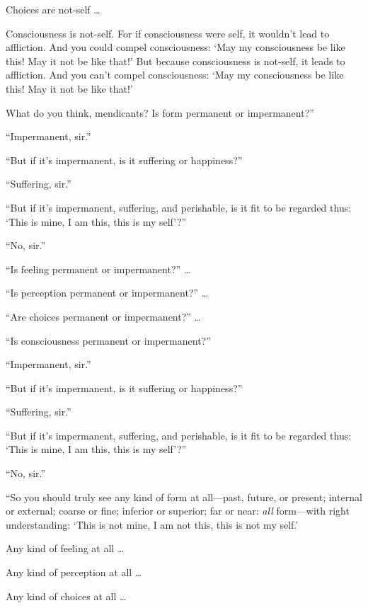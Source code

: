 \documentclass[12pt,openany]{book}%
\begin{document}
Choices are not-self … 

Consciousness is not-self. For if consciousness were self, it wouldn’t lead to affliction. And you could compel consciousness: ‘May my consciousness be like this! May it not be like that!’ But because consciousness is not-self, it leads to affliction. And you can’t compel consciousness: ‘May my consciousness be like this! May it not be like that!’ 

What do you think, mendicants? Is form permanent or impermanent?” 

“Impermanent, sir.” 

“But if it’s impermanent, is it suffering or happiness?” 

“Suffering, sir.” 

“But if it’s impermanent, suffering, and perishable, is it fit to be regarded thus: ‘This is mine, I am this, this is my self’?” 

“No, sir.” 

“Is feeling permanent or impermanent?” … 

“Is perception permanent or impermanent?” … 

“Are choices permanent or impermanent?” … 

“Is consciousness permanent or impermanent?” 

“Impermanent, sir.” 

“But if it’s impermanent, is it suffering or happiness?” 

“Suffering, sir.” 

“But if it’s impermanent, suffering, and perishable, is it fit to be regarded thus: ‘This is mine, I am this, this is my self’?” 

“No, sir.” 

“So you should truly see any kind of form at all—past, future, or present; internal or external; coarse or fine; inferior or superior; far or near: \emph{all} form—with right understanding: ‘This is not mine, I am not this, this is not my self.’ 

Any kind of feeling at all … 

Any kind of perception at all … 

Any kind of choices at all … 
\end{document}
